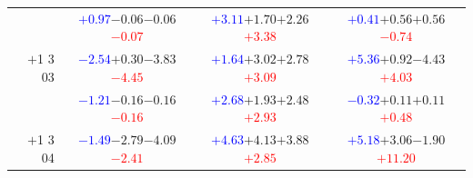 \documentclass[compress]{beamer}
\begin{document}
\begin{frame}
\begin{tabular}{r | c | c | c}
          & \textcolor{blue}{$+0.97$}\hspace{0.1 cm}$-0.06$\hspace{0.1 cm}$-0.06$\hspace{0.1 cm}\textcolor{red}{$-0.07$} & \textcolor{blue}{$+3.11$}\hspace{0.1 cm}$+1.70$\hspace{0.1 cm}$+2.26$\hspace{0.1 cm}\textcolor{red}{$+3.38$} & \textcolor{blue}{$+0.41$}\hspace{0.1 cm}$+0.56$\hspace{0.1 cm}$+0.56$\hspace{0.1 cm}\textcolor{red}{$-0.74$} \\
$+$1 3 03 & \textcolor{blue}{$-2.54$}\hspace{0.1 cm}$+0.30$\hspace{0.1 cm}$-3.83$\hspace{0.1 cm}\textcolor{red}{$-4.45$} & \textcolor{blue}{$+1.64$}\hspace{0.1 cm}$+3.02$\hspace{0.1 cm}$+2.78$\hspace{0.1 cm}\textcolor{red}{$+3.09$} & \textcolor{blue}{$+5.36$}\hspace{0.1 cm}$+0.92$\hspace{0.1 cm}$-4.43$\hspace{0.1 cm}\textcolor{red}{$+4.03$} \\
          & \textcolor{blue}{$-1.21$}\hspace{0.1 cm}$-0.16$\hspace{0.1 cm}$-0.16$\hspace{0.1 cm}\textcolor{red}{$-0.16$} & \textcolor{blue}{$+2.68$}\hspace{0.1 cm}$+1.93$\hspace{0.1 cm}$+2.48$\hspace{0.1 cm}\textcolor{red}{$+2.93$} & \textcolor{blue}{$-0.32$}\hspace{0.1 cm}$+0.11$\hspace{0.1 cm}$+0.11$\hspace{0.1 cm}\textcolor{red}{$+0.48$} \\
$+$1 3 04 & \textcolor{blue}{$-1.49$}\hspace{0.1 cm}$-2.79$\hspace{0.1 cm}$-4.09$\hspace{0.1 cm}\textcolor{red}{$-2.41$} & \textcolor{blue}{$+4.63$}\hspace{0.1 cm}$+4.13$\hspace{0.1 cm}$+3.88$\hspace{0.1 cm}\textcolor{red}{$+2.85$} & \textcolor{blue}{$+5.18$}\hspace{0.1 cm}$+3.06$\hspace{0.1 cm}$-1.90$\hspace{0.1 cm}\textcolor{red}{$+11.20$} \\

\end{tabular}
\end{frame}
\end{document}
